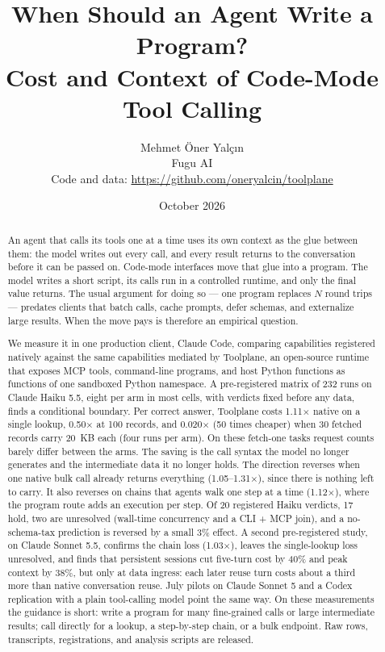 \documentclass[10pt,twocolumn]{article}
\title{\textbf{When Should an Agent Write a Program?}\\
Cost and Context of Code-Mode Tool Calling}
\author{Mehmet Öner Yalçın\\Fugu AI\\[4pt]{\normalsize Code and data: \url{https://github.com/oneryalcin/toolplane}}}
\date{October 2026}
\begin{document}
\maketitle


\begin{abstract}
An agent that calls its tools one at a time uses its own context as the glue
between them: the model writes out every call, and every result returns to
the conversation before it can be passed on.  Code-mode interfaces move that
glue into a program.  The model writes a short script, its calls run in a
controlled runtime, and only the final value returns.  The usual argument for
doing so --- one program replaces $N$ round trips --- predates clients that
batch calls, cache prompts, defer schemas, and externalize large results.
When the move pays is therefore an empirical question.

We measure it in one production client, Claude Code, comparing capabilities
registered natively against the same capabilities mediated by Toolplane, an
open-source runtime that exposes MCP tools, command-line programs, and host
Python functions as functions of one sandboxed Python namespace.  A
pre-registered matrix of 232 runs on Claude Haiku 5.5, eight per arm in most
cells, with verdicts fixed before any data, finds a conditional boundary.  Per
correct answer, Toolplane costs 1.11$\times$ native on a single lookup,
0.50$\times$ at 100 records, and 0.020$\times$ (50 times cheaper) when 30
fetched records carry 20~KB each (four runs per arm).  On these fetch-one
tasks request counts barely differ between the arms.  The saving is the call
syntax the model no longer generates and the intermediate data it no longer
holds.  The direction reverses when one native bulk call already returns
everything (1.05--1.31$\times$), since there is nothing left to carry.  It
also reverses on chains that agents walk one step at a time
(1.12$\times$), where the program route adds an execution per step.  Of 20 registered Haiku verdicts, 17 hold, two are
unresolved (wall-time concurrency and a CLI + MCP join), and a
no-schema-tax prediction is reversed by a small 3\% effect.  A second
pre-registered study, on Claude Sonnet 5.5, confirms the chain loss
(1.03$\times$), leaves the single-lookup loss unresolved, and finds that
persistent sessions cut five-turn cost by 40\% and peak context by 38\%, but
only at data ingress: each later reuse turn costs about a third more than
native conversation reuse.  July pilots on Claude Sonnet 5 and a Codex
replication with a plain tool-calling model point the same way.  On these
measurements the guidance is short: write a program for many fine-grained
calls or large intermediate results; call directly for a lookup, a
step-by-step chain, or a bulk endpoint.  Raw rows, transcripts, registrations, and analysis scripts are
released.
\end{abstract}
\end{document}
